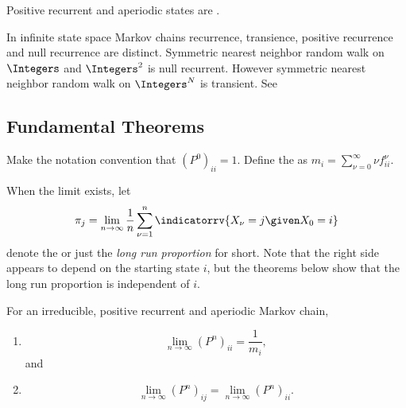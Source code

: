 \documentclass[12pt]{article}
\begin{document}
\begin{definition}
    Positive recurrent and aperiodic states are .
\end{definition}

\begin{example}
  In infinite state space Markov chains recurrence, transience, positive
  recurrence and null recurrence are distinct.  Symmetric nearest
  neighbor random walk on \( \Integers \) and \( \Integers^2 \) is
  null recurrent.  However symmetric nearest
  neighbor random walk on \( \Integers^N \) is transient.  See
  \cite[Chapter 13]{lesigne05}
\end{example}
\subsection*{Fundamental Theorems}

\begin{remark}
    Make the notation convention that \( (P^{0})_{ii} = 1 \).  Define
    the  as \( m_i = \sum_ {\nu=0}^
    {\infty} \nu f^\nu_{ii} \).
\end{remark}

\begin{definition}
    When the limit exists, let
    \[
        \pi_j = \lim_{n \to \infty} \frac{1}{n} \sum\limits_{\nu=1}^n
        \indicatorrv{X_{\nu}= j \given X_0 = i}
    \] denote the  or just the \emph{long run proportion} for short.
    Note that the right side appears to depend on the starting state \(
    i \), but the theorems below show that the long run proportion is
    independent of \( i \).
\end{definition}

\begin{theorem}
    For an irreducible, positive recurrent and aperiodic Markov chain,
    \begin{enumerate}
        \item
            \[
                \lim_{n \to \infty} (P^{n})_{ii} = \frac{1}{m_i},
            \] and
        \item
            \[
                \lim_{n \to \infty} (P^{n})_{ij} = \lim_{n \to \infty} (P^{n})_{ii}.
            \]
    \end{enumerate}
\end{theorem}
\end{document}

